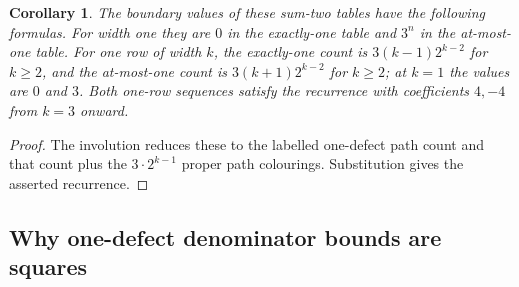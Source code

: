\documentclass[11pt,a4paper]{article}
\newtheorem{corollary}[theorem]{Corollary}
\begin{document}
\begin{corollary}\label{cor:sum-boundary}
The boundary values of these sum-two tables have the following formulas.
For width one they are $0$ in the exactly-one table and $3^n$ in the
at-most-one table. For one row of width $k$, the exactly-one count is
$3(k-1)2^{k-2}$ for $k\geq2$, and the at-most-one count is
$3(k+1)2^{k-2}$ for $k\geq2$; at $k=1$ the values are $0$ and $3$.
Both one-row sequences satisfy the recurrence with coefficients
$4,-4$ from $k=3$ onward.
\end{corollary}
\begin{proof}
The involution reduces these to the labelled one-defect path count
and that count plus the $3\cdot2^{k-1}$ proper path colourings.
Substitution gives the asserted recurrence.
\end{proof}

\subsection{Why one-defect denominator bounds are squares}
\end{document}
